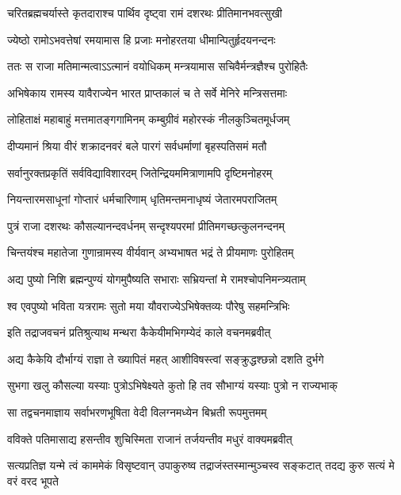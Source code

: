\twolineshloka
{चरितब्रह्मचर्यास्ते कृतदाराश्च पार्थिव}
{दृष्ट्वा रामं दशरथः प्रीतिमानभवत्सुखी}


\twolineshloka
{ज्येष्ठो रामोऽभवत्तेषां रमयामास हि प्रजाः}
{मनोहरतया धीमान्पितुर्हृदयनन्दनः}


\twolineshloka
{ततः स राजा मतिमान्मत्वाऽऽत्मानं वयोधिकम्}
{मन्त्रयामास सचिवैर्मन्त्रज्ञैश्च पुरोहितैः}


\twolineshloka
{अभिषेकाय रामस्य यावैराज्येन भारत}
{प्राप्तकालं च ते सर्वे मेनिरे मन्त्रिसत्तमाः}


\twolineshloka
{लोहिताक्षं महाबाहुं मत्तमातङ्गगामिनम्}
{कम्बुग्रीवं महोरस्कं नीलकुञ्चितमूर्धजम्}


\twolineshloka
{दीप्यमानं श्रिया वीरं शक्रादनवरं बले}
{पारगं सर्वधर्माणां बृहस्पतिसमं मतौ}


\twolineshloka
{सर्वानुरक्तप्रकृतिं सर्वविद्याविशारदम्}
{जितेन्द्रियममित्राणामपि दृष्टिमनोहरम्}


\twolineshloka
{नियन्तारमसाधूनां गोप्तारं धर्मचारिणाम्}
{धृतिमन्तमनाधृष्यं जेतारमपराजितम्}


\twolineshloka
{पुत्रं राजा दशरथः कौसल्यानन्दवर्धनम्}
{सन्दृश्यपरमां प्रीतिमगच्छत्कुलनन्दनम्}


\twolineshloka
{चिन्तयंश्च महातेजा गुणान्रामस्य वीर्यवान्}
{अभ्यभाषत भद्रं ते प्रीयमाणः पुरोहितम्}


\twolineshloka
{अद्य पुष्यो निशि ब्रह्मन्पुण्यं योगमुपैष्यति}
{सभाराः सभ्रियन्तां मे रामश्चोपनिमन्त्र्यताम्}


\twolineshloka
{श्व एवपुष्यो भविता यत्ररामः सुतो मया}
{यौवराज्येऽभिषेक्तव्यः पौरेषु सहमन्त्रिभिः}


\twolineshloka
{इति तद्राजवचनं प्रतिश्रुत्याथ मन्थरा}
{कैकेयीमभिगम्येदं काले वचनमब्रवीत्}


\twolineshloka
{अद्य कैकेयि दौर्भाग्यं राज्ञा ते ख्यापितं महत्}
{आशीविषस्त्वां सङ्क्रुद्धश्छन्नो दशति दुर्भगे}


\twolineshloka
{सुभगा खलु कौसल्या यस्याः पुत्रोऽभिषेक्ष्यते}
{कुतो हि तव सौभाग्यं यस्याः पुत्रो न राज्यभाक्}


\twolineshloka
{सा तद्वचनमाज्ञाय सर्वाभरणभूषिता}
{वेदी विलग्नमध्येन बिभ्रती रूपमुत्तमम्}


\twolineshloka
{वविक्ते पतिमासाद्य हसन्तीव शुचिस्मिता}
{राजानं तर्जयन्तीव मधुरं वाक्यमब्रवीत्}


\threelineshloka
{सत्यप्रतिज्ञ यन्मे त्वं काममेकं विसृष्टवान्}
{उपाकुरुष्व तद्राजंस्तस्मान्मुञ्चस्व सङ्कटात्}
{तदद्य कुरु सत्यं मे वरं वरद भूपते}



